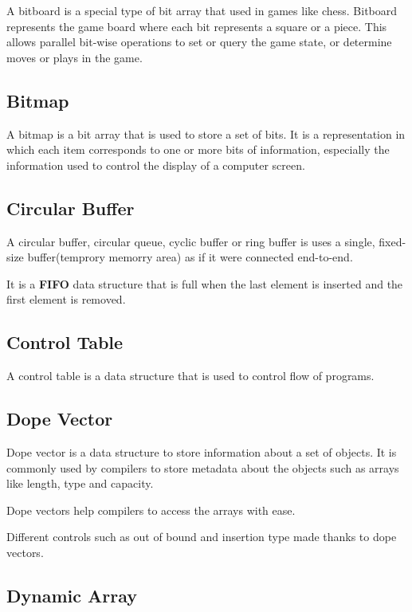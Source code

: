 \documentclass{book}
\begin{document}
A bitboard is a special type of bit array that used in games like chess. Bitboard represents the game board where each bit represents a square or a piece. This allows parallel bit-wise operations to set or query the game state, or determine moves or plays in the game.

\subsection{Bitmap}

A bitmap is a bit array that is used to store a set of bits. It is a representation in which each item corresponds to one or more bits of information, especially the information used to control the display of a computer screen.

\subsection{Circular Buffer}

A circular buffer, circular queue, cyclic buffer or ring buffer is uses a single, fixed-size buffer(temprory memorry area) as if it were connected end-to-end.

\noindent It is a \textbf{FIFO} data structure that is full when the last element is inserted and the first element is removed.

\subsection{Control Table}

A control table is a data structure that is used to control flow of programs.

\subsection{Dope Vector}

Dope vector is a data structure to store information about a set of objects. It is commonly used by compilers to store metadata about the objects such as arrays like length, type and capacity.

\noindent Dope vectors help compilers to access the arrays with ease.

\noindent Different controls such as out of bound and insertion type made thanks to dope vectors.

\subsection{Dynamic Array}
\end{document}
